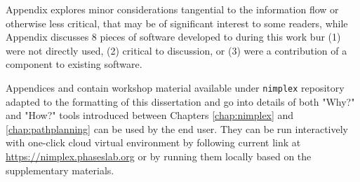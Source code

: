 Appendix  explores minor considerations tangential to the information flow or otherwise less critical, that may be of significant interest to some readers, while Appendix  discusses 8 pieces of software developed to during this work bur (1) were not directly used, (2) critical to discussion, or (3) were a contribution of a component to existing software.

Appendices  and  contain workshop material available under \texttt{nimplex} repository adapted to the formatting of this dissertation and go into details of both "Why?" and "How?" tools introduced between Chapters \ref{chap:nimplex} and \ref{chap:pathplanning} can be used by the end user. They can be run interactively with one-click cloud virtual environment by following current link at \href{https://nimplex.phaseslab.org}{https://nimplex.phaseslab.org} or by running them locally based on the supplementary materials.



\printbibliography[heading=subbibintoc]
